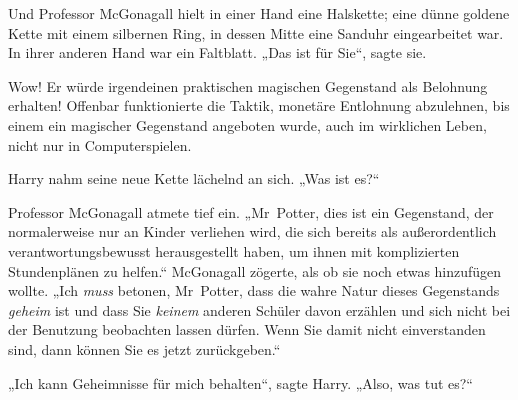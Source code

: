 Und Professor McGonagall hielt in einer Hand eine Halskette; eine dünne goldene Kette mit einem silbernen Ring, in dessen Mitte eine Sanduhr eingearbeitet war. In ihrer anderen Hand war ein Faltblatt.
„Das ist für Sie“, sagte sie.

Wow! Er würde irgendeinen praktischen magischen Gegenstand als Belohnung erhalten! Offenbar funktionierte die Taktik, monetäre Entlohnung abzulehnen, bis einem ein magischer Gegenstand angeboten wurde, auch im wirklichen Leben, nicht nur in Computerspielen.

Harry nahm seine neue Kette lächelnd an sich.
„Was ist es?“

Professor McGonagall atmete tief ein.
„Mr~Potter, dies ist ein Gegenstand, der normalerweise nur an Kinder verliehen wird, die sich bereits als außerordentlich verantwortungsbewusst herausgestellt haben, um ihnen mit komplizierten Stundenplänen zu helfen.“ McGonagall zögerte, als ob sie noch etwas hinzufügen wollte.
„Ich \emph{muss} betonen, Mr~Potter, dass die wahre Natur dieses Gegenstands \emph{geheim} ist und dass Sie \emph{keinem} anderen Schüler davon erzählen und sich nicht bei der Benutzung beobachten lassen dürfen. Wenn Sie damit nicht einverstanden sind, dann können Sie es jetzt zurückgeben.“

„Ich kann Geheimnisse für mich behalten“, sagte Harry.
„Also, was tut es?“

